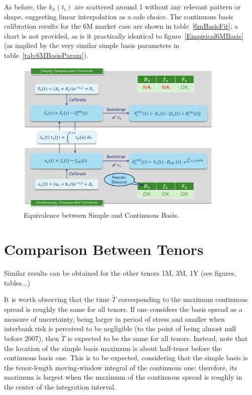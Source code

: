 \documentclass{article}
\begin{document}
As before, the $k_x(t_i)$ are scattered around 1 without any relevant pattern or shape, suggesting linear interpolation as a safe choice. The continuous basis calibration results for the 6M market case are shown in table~\ref{6mBasisFit}; a chart is not provided, as is it practically identical to figure~\ref{Empirical6MBasis} (as implied by the very similar simple basis parameters in table~\ref{tab:6MBasisParam}).


\begin{figure}[t]
\centering
\includegraphics[width=0.9\textwidth]{SimpleContinuousEquivalence.png}
\caption{Equivalence between Simple and Continuous Basis.}
\label{SimpleContinuousEquivalence}
\end{figure}






\section{Comparison Between Tenors}
\label{sec:tenor-comparison}


Similar results can be obtained for the other tenors 1M, 3M, 1Y (see figures, tables...)

It is worth observing that the time $\tilde{T}$ corresponding to the maximum continuous spread is roughly the same for all tenors. If one considers the basis spread as a measure of uncertainty, being larger in period of stress and smaller when interbank risk is perceived to be negligible (to the point of being almost null before 2007), then $\tilde{T}$ is expected to be the same for all tenors. Instead, note that the location of the simple basis maximum is about half-tenor before the continuous basis one. This is to be expected, considering that the simple basis is the tenor-length moving-window integral of the continuous one: therefore, its maximum is largest when the maximum of the continuous spread is roughly in the center of the integration interval.
 
\end{document}
